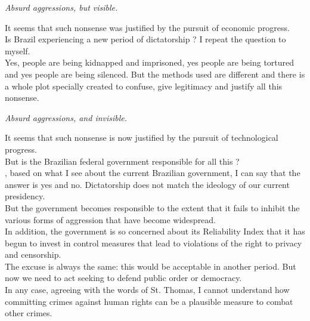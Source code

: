 \documentclass[11pt]{book}
\begin{document}
\noindent \begin{center} \emph{Absurd aggressions, but visible.} \end{center}

\noindent It seems that such nonsense was justified by the pursuit of economic progress. \\

\noindent Is Brazil experiencing a new period of dictatorship ? I repeat the question to myself. \\
 
\noindent Yes, people are being kidnapped and imprisoned, yes people are being tortured and yes people are being silenced. But the methods used are different and there is a whole plot specially created to confuse, give legitimacy and justify all this nonsense.

\noindent \begin{center} \emph{Absurd aggressions, and invisible.} \end{center}

\noindent It seems that such nonsense is now justified by the pursuit of technological progress. \\

\noindent But is the Brazilian federal government responsible for all this ? \\

, based on what I see about the current Brazilian government, I can say that the answer is yes and no. Dictatorship does not match the ideology of our current presidency. \\

\noindent  But the government becomes responsible to the extent that it fails to inhibit the various forms of aggression that have become widespread. \\

\noindent In addition, the government is so concerned about its Reliability Index that it has begun to invest in control measures that lead to violations of the right to privacy and censorship. \\

\noindent The excuse is always the same: this would be acceptable in another period. But now we need to act seeking to defend public order or democracy. \\

\noindent In any case, agreeing with the words of St. Thomas, I cannot understand how committing crimes against human rights can be a plausible measure to combat other crimes. \\
\end{document}
